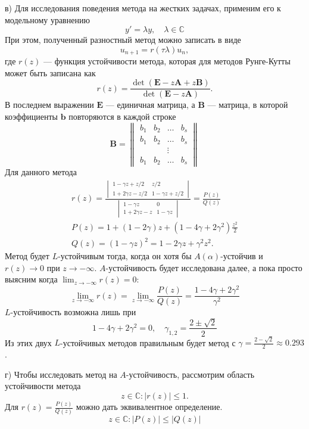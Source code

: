 \documentclass[12pt]{article}
\renewcommand{\vec}[1]{\boldsymbol{\mathbf{#1}}}
\begin{document}
в) Для исследования поведения метода на жестких задачах, применим его к модельному уравнению 
\[
y' = \lambda y,\quad\lambda \in \mathbb{C}
\]
При этом, полученный разностный метод можно записать в виде
\[
u_{n+1} = r(\tau \lambda) u_n,
\]
где $r(z)$ --- функция устойчивости метода, которая для методов Рунге-Кутты может быть записана как
\[
r(z) = \frac{\operatorname{det}(\vec E - z \vec A + z\vec B)}{\operatorname{det}(\vec E - z\vec A)}.
\]
В последнем выражении $\vec E$ --- единичная матрица, а $\vec B$ --- матрица, в которой коэффициенты $\vec b$ повторяются в каждой строке
\[
	\vec B = \begin{Vmatrix}
	b_1 & b_2 & \dots & b_s\\
	b_1 & b_2 & \dots & b_s\\
	&&\vdots\\
	b_1 & b_2 & \dots & b_s
	\end{Vmatrix}
\]
Для данного метода 
\begin{gather*}
r(z) = \frac{\begin{vmatrix}
	1 - \gamma z + z/2 & z/2\\
	1 + 2\gamma z - z/2 & 1 - \gamma z + z/2
	\end{vmatrix}}{\begin{vmatrix}
	1 - \gamma z & 0\\
	1 + 2\gamma z - z & 1 - \gamma z
	\end{vmatrix}}
	= \frac{P(z)}{Q(z)}\\
P(z) = 1 + (1 - 2\gamma) z + (1 - 4\gamma + 2\gamma^2)\frac{z^2}{2}\\
Q(z) = (1 - \gamma z)^2 = 1 - 2\gamma z + \gamma^2 z^2.
\end{gather*}
Метод будет $L$-устойчивым тогда, когда он хотя бы $A(\alpha)$-устойчив и $r(z)
\rightarrow 0$ при $z \rightarrow -\infty$. $A$-устойчивость будет исследована
далее, а пока просто выясним когда $\lim_{z\to -\infty }r(z) = 0$:
\[
\lim_{z \rightarrow -\infty} r(z) = \lim_{z \rightarrow -\infty} \frac{P(z)}{Q(z)} = 
\frac{1 - 4 \gamma + 2 \gamma ^2}{\gamma^2}
\]
$L$-устойчивость возможна лишь при
\[
1 - 4\gamma + 2 \gamma^2 = 0, \quad \gamma_{1,2} = \frac{2 \pm \sqrt{2}}{2}
\]
Из этих двух $L$-устойчивых методов правильным будет метод с $\gamma = \frac{2 - \sqrt{2}}{2} \approx 0.293$.

г) Чтобы исследовать метод на $A$-устойчивость, рассмотрим область устойчивости метода
\[z \in \mathbb{C} : |r(z)| \leqslant 1.\]
Для $r(z) = \frac{P(z)}{Q(z)}$ можно дать эквивалентное определение.
\[z \in \mathbb{C} : |P(z)| \leqslant |Q(z)|\]
\end{document}
